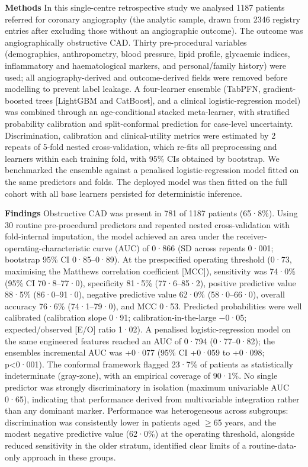\documentclass[
  english,
  11pt,
]{article}
\begin{document}
\textbf{Methods} In this single-centre retrospective study we analysed
1187 patients referred for coronary angiography (the analytic sample,
drawn from 2346 registry entries after excluding those without an
angiographic outcome). The outcome was angiographically obstructive CAD.
Thirty pre-procedural variables (demographics, anthropometry, blood
pressure, lipid profile, glycaemic indices, inflammatory and
haematological markers, and personal/family history) were used; all
angiography-derived and outcome-derived fields were removed before
modelling to prevent label leakage. A four-learner ensemble (TabPFN,
gradient-boosted trees {[}LightGBM and CatBoost{]}, and a clinical
logistic-regression model) was combined through an age-conditional
stacked meta-learner, with stratified probability calibration and
split-conformal prediction for case-level uncertainty. Discrimination,
calibration and clinical-utility metrics were estimated by 2 repeats of
5-fold nested cross-validation, which re-fits all preprocessing and
learners within each training fold, with 95\% CIs obtained by bootstrap.
We benchmarked the ensemble against a penalised logistic-regression
model fitted on the same predictors and folds. The deployed model was
then fitted on the full cohort with all base learners persisted for
deterministic inference.

\textbf{Findings} Obstructive CAD was present in 781 of 1187 patients
(65·8\%). Using 30 routine pre-procedural predictors and repeated nested
cross-validation with fold-internal imputation, the model achieved an
area under the receiver-operating-characteristic curve (AUC) of 0·866
(SD across repeats 0·001; bootstrap 95\% CI 0·85--0·89). At the
prespecified operating threshold (0·73, maximising the Matthews
correlation coefficient {[}MCC{]}), sensitivity was 74·0\% (95\% CI
70·8--77·0), specificity 81·5\% (77·6--85·2), positive predictive value
88·5\% (86·0--91·0), negative predictive value 62·0\% (58·0--66·0),
overall accuracy 76·6\% (74·1--79·0), and MCC 0·53. Predicted
probabilities were well calibrated (calibration slope 0·91;
calibration-in-the-large −0·05; expected/observed {[}E/O{]} ratio 1·02).
A penalised logistic-regression model on the same engineered features
reached an AUC of 0·794 (0·77--0·82); the ensemble\textquotesingle s
incremental AUC was +0·077 (95\% CI +0·059 to +0·098; p\textless0·001).
The conformal framework flagged 23·7\% of patients as statistically
indeterminate (gray-zone), with an empirical coverage of 90·1\%. No
single predictor was strongly discriminatory in isolation (maximum
univariable AUC 0·65), indicating that performance derived from
multivariable integration rather than any dominant marker. Performance
was heterogeneous across subgroups: discrimination was consistently
lower in patients aged \(\ge\)65 years, and the modest negative predictive
value (62·0\%) at the operating threshold, alongside reduced sensitivity
in the older stratum, identified clear limits of a routine-data-only
approach in these groups.
\end{document}

